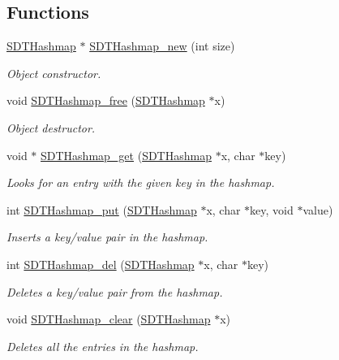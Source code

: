 \subsection*{Functions}
\begin{DoxyCompactItemize}
\item 
\hyperlink{group__structs_gaf9aa86ada58e2863bd06d6feb4fdf07c}{S\+D\+T\+Hashmap} $\ast$ \hyperlink{group__structs_ga80b88bc1e13aeeed73863c3a5855baa1}{S\+D\+T\+Hashmap\+\_\+new} (int size)
\begin{DoxyCompactList}\small\item\em Object constructor. \end{DoxyCompactList}\item 
void \hyperlink{group__structs_ga2d8f81e03ba59b433fa1fe0ff760ec82}{S\+D\+T\+Hashmap\+\_\+free} (\hyperlink{group__structs_gaf9aa86ada58e2863bd06d6feb4fdf07c}{S\+D\+T\+Hashmap} $\ast$x)
\begin{DoxyCompactList}\small\item\em Object destructor. \end{DoxyCompactList}\item 
void $\ast$ \hyperlink{group__structs_ga2e7b98637480590ed4c7f873200d8db7}{S\+D\+T\+Hashmap\+\_\+get} (\hyperlink{group__structs_gaf9aa86ada58e2863bd06d6feb4fdf07c}{S\+D\+T\+Hashmap} $\ast$x, char $\ast$key)
\begin{DoxyCompactList}\small\item\em Looks for an entry with the given key in the hashmap. \end{DoxyCompactList}\item 
int \hyperlink{group__structs_gaeb73501a575fbc9c4d8603456a05b204}{S\+D\+T\+Hashmap\+\_\+put} (\hyperlink{group__structs_gaf9aa86ada58e2863bd06d6feb4fdf07c}{S\+D\+T\+Hashmap} $\ast$x, char $\ast$key, void $\ast$value)
\begin{DoxyCompactList}\small\item\em Inserts a key/value pair in the hashmap. \end{DoxyCompactList}\item 
int \hyperlink{group__structs_gac8c9b9ea95106b84ff6990e9a67ebcf7}{S\+D\+T\+Hashmap\+\_\+del} (\hyperlink{group__structs_gaf9aa86ada58e2863bd06d6feb4fdf07c}{S\+D\+T\+Hashmap} $\ast$x, char $\ast$key)
\begin{DoxyCompactList}\small\item\em Deletes a key/value pair from the hashmap. \end{DoxyCompactList}\item 
\hypertarget{group__structs_gae537b6cca07a0106a788e6d8a0f53958}{}void \hyperlink{group__structs_gae537b6cca07a0106a788e6d8a0f53958}{S\+D\+T\+Hashmap\+\_\+clear} (\hyperlink{group__structs_gaf9aa86ada58e2863bd06d6feb4fdf07c}{S\+D\+T\+Hashmap} $\ast$x)\label{group__structs_gae537b6cca07a0106a788e6d8a0f53958}

\begin{DoxyCompactList}\small\item\em Deletes all the entries in the hashmap. \end{DoxyCompactList}\end{DoxyCompactItemize}


